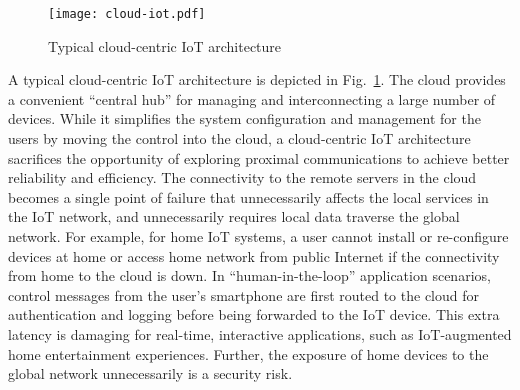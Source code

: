 
\begin{figure}[!t]
\centering
\texttt{[image: cloud-iot.pdf]}
\caption{Typical cloud-centric IoT architecture}
\label{fig:cloud-iot}
\end{figure}

A typical cloud-centric IoT architecture is depicted in Fig.~\ref{fig:cloud-iot}.
The cloud provides a convenient ``central hub'' for managing and interconnecting a large number of devices. 
While it simplifies the system configuration and management for the users by moving the control into the cloud, a cloud-centric IoT architecture sacrifices the opportunity of exploring proximal communications to achieve better reliability and efficiency.
The connectivity to the remote servers in the cloud becomes a single point of failure that unnecessarily affects the local services in the IoT network, and unnecessarily requires local data traverse the global network.
For example, for home IoT systems, a user cannot install or re-configure devices at home or access home network from public Internet if the connectivity from home to the cloud is down.
In ``human-in-the-loop'' application scenarios, control messages from the user's smartphone are first routed to the cloud for authentication and logging before being forwarded to the IoT device.
This extra latency is damaging for real-time, interactive applications, such as IoT-augmented home entertainment experiences. Further, the exposure of home devices to the global network unnecessarily is a security risk.
